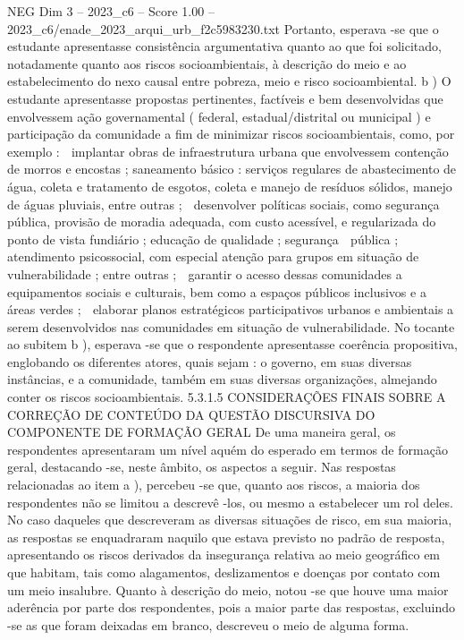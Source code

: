 \begin{textsample}{NEG Dim 3 – 2023\_c6 – Score 1.00 – 2023\_c6/enade\_2023\_arqui\_urb\_f2c5983230.txt}
Portanto, esperava -se que o estudante apresentasse consistência argumentativa quanto ao que foi solicitado, notadamente quanto aos riscos socioambientais, à descrição do meio e ao estabelecimento do nexo causal entre pobreza, meio e risco socioambiental. b ) O estudante apresentasse propostas pertinentes, factíveis e bem desenvolvidas que envolvessem ação governamental ( federal, estadual/distrital ou municipal ) e participação da comunidade a fim de minimizar riscos socioambientais, como, por exemplo :  implantar obras de infraestrutura urbana que envolvessem contenção de morros e encostas ; saneamento básico : serviços regulares de abastecimento de água, coleta e tratamento de esgotos, coleta e manejo de resíduos sólidos, manejo de águas pluviais, entre outras ;  desenvolver políticas sociais, como segurança pública, provisão de moradia adequada, com custo acessível, e regularizada do ponto de vista fundiário ; educação de qualidade ; segurança  pública ; atendimento psicossocial, com especial atenção para grupos em situação de vulnerabilidade ; entre outras ;  garantir o acesso dessas comunidades a equipamentos sociais e culturais, bem como a espaços públicos inclusivos e a áreas verdes ;  elaborar planos estratégicos participativos urbanos e ambientais a serem desenvolvidos nas comunidades em situação de vulnerabilidade.
No tocante ao subitem b ), esperava -se que o respondente apresentasse coerência propositiva, englobando os diferentes atores, quais sejam : o governo, em suas diversas instâncias, e a comunidade, também em suas diversas organizações, almejando conter os riscos socioambientais. 5.3.1.5 CONSIDERAÇÕES FINAIS SOBRE A CORREÇÃO DE CONTEÚDO DA QUESTÃO DISCURSIVA DO COMPONENTE DE FORMAÇÃO GERAL De uma maneira geral, os respondentes apresentaram um nível aquém do esperado em termos de formação geral, destacando -se, neste âmbito, os aspectos a seguir.
Nas respostas relacionadas ao item a ), percebeu -se que, quanto aos riscos, a maioria dos respondentes não se limitou a descrevê -los, ou mesmo a estabelecer um rol deles.
No caso daqueles que descreveram as diversas situações de risco, em sua maioria, as respostas se enquadraram naquilo que estava previsto no padrão de resposta, apresentando os riscos derivados da insegurança relativa ao meio geográfico em que habitam, tais como alagamentos, deslizamentos e doenças por contato com um meio insalubre.
Quanto à descrição do meio, notou -se que houve uma maior aderência por parte dos respondentes, pois a maior parte das respostas, excluindo -se as que foram deixadas em branco, descreveu o meio de alguma forma.

\end{textsample}
